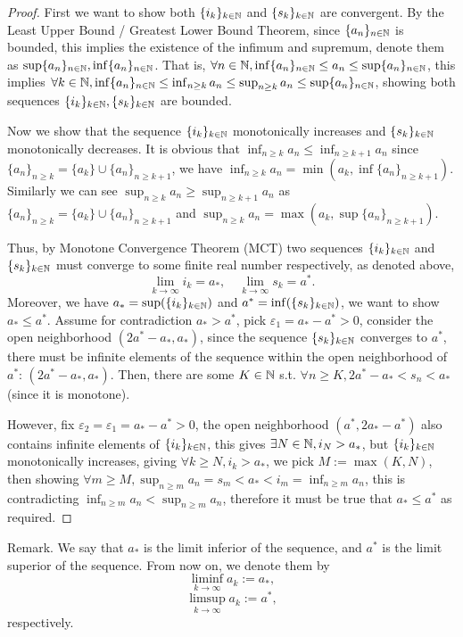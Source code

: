 \documentclass{homework}
\newcommand{\N}{\bb{N}} %
\newcommand{\ra}{\rightarrow}
\newcommand{\?}{\stackrel{?}{=}}
\newcommand{\ep}{\varepsilon}
\theoremstyle{definition}
\begin{document}
\begin{proof}
    First we want to show both $\{i_k\}_{k\in\N}$ and $\{s_k\}_{k\in\N}$ are convergent. By the Least Upper Bound / Greatest Lower Bound Theorem, since $\{a_n\}_{n\in\N}$ is bounded, this implies the existence of the infimum and supremum, denote them as $\sup\{a_n\}_{n\in\N}, \inf\{a_n\}_{n\in\N}$. That is, $\forall n\in\N, \inf\{a_n\}_{n\in\N} \leq a_n \leq \sup\{a_n\}_{n\in\N}$, this implies $\forall k\in\N, \inf\{a_n\}_{n\in\N}\leq \inf_{n\geq k}a_n\leq \sup_{n\geq k}a_n\leq\sup\{a_n\}_{n\in\N}$, showing both sequences $\{i_k\}_{k\in\N},\{s_k\}_{k\in\N}$ are bounded. 
    
    Now we show that the sequence $\{i_k\}_{k\in\N}$ monotonically increases and $\{s_k\}_{k\in\N}$ monotonically decreases. It is obvious that $\inf_{n\geq k}a_n \leq \inf_{n\geq k+1}a_n$ since $\{a_n\}_{n\geq k} = \{a_k\}\cup\{a_{n}\}_{n\geq k+1}$, we have $\inf_{n\geq k}a_n = \min(a_k, \inf\{a_n\}_{n\geq k+1})$. Similarly we can see $\sup_{n\geq k}a_n \geq \sup_{n\geq k+1}a_n$ as $\{a_n\}_{n\geq k} = \{a_k\}\cup\{a_n\}_{n\geq k+1}$ and $\sup_{n\geq k}a_n = \max(a_k, \sup\{a_n\}_{n\geq k+1})$. 
    
    Thus, by Monotone Convergence Theorem (MCT) two sequences $\{i_k\}_{k\in\N}$ and $\{s_k\}_{k\in\N}$ must converge to some finite real number respectively, as denoted above, \[\lim_{k\ra\infty}i_k=a_*, \quad \lim_{k\ra\infty}s_k=a^*.\]
    Moreover, we have $a_* = \sup(\{i_k\}_{k\in\N})$ and $a^*=\inf(\{s_k\}_{k\in\N})$, we want to show $a_*\leq a^*$. Assume for contradiction $a_*>a^*$, pick $\ep_1=a_*-a^*>0$, consider the open neighborhood $(2a^*-a_*, a_*)$, since the sequence $\{s_k\}_{k\in\N}$ converges to $a^*$, there must be infinite elements of the sequence within the open neighborhood of $a^*$: $(2a^*-a_*,a_*)$. Then, there are some $K\in\N$ s.t. $\forall n\geq K, 2a^*-a_*< s_n< a_*$ (since it is monotone).  
    
    However,  fix $\ep_2=\ep_1=a_*-a^*>0$, the open neighborhood $(a^*, 2a_*-a^*)$ also contains infinite elements of $\{i_k\}_{k\in\N}$, this gives $\exists N\in\N, i_N>a_*$, but $\{i_k\}_{k\in\N}$ monotonically increases, giving $\forall k\geq N, i_k>a_*$, we pick $M:=\max(K, N)$, then showing $\forall m\geq M, \sup_{n\geq m}a_n=s_m<a_*<i_m=\inf_{n\geq m}a_n$, this is contradicting $\inf_{n\geq m}a_n < \sup_{n\geq m}a_n$, therefore it must be true that $a_*\leq a^*$ as required. 
\end{proof}


Remark. We say that $a_*$ is the limit inferior of the sequence, and $a^*$ is the limit superior of the sequence. From now on, we denote them by \[\liminf_{k\ra\infty} a_k := a_*,\]
\[\limsup_{k\ra\infty}a_k:=a^*,\]
respectively. 
\end{document}
